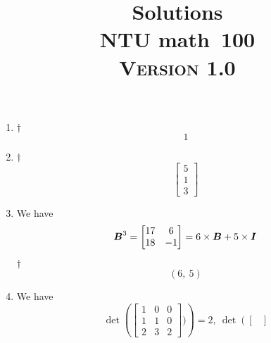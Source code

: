 \documentclass[a4paper,12pt]{article}
\newcommand{\school}{ntu}
\newcommand{\subject}{math}
\renewcommand{\year}{100}
\newcommand{\titlename}{\MakeUppercase{\school} \subject \ \year}
\newcommand{\ver}{\textsc{Version} 1.0} %
\begin{document}
\title{\LARGE{\textbf{Solutions}} \\
	\Huge{\textbf{\titlename}} \\
	\normalsize{\ver}
}
\author{}
\date{}

\maketitle


\begin{enumerate}
	\item \begin{answer}{$\dag$}\begin{equation}
            1
        \end{equation}
    \end{answer}
    \item \begin{answer}{$\dag$}\begin{equation}
            \begin{bmatrix}
                5 \\
                1 \\
                3
            \end{bmatrix}
        \end{equation}
    \end{answer}
    \item We have \begin{equation}
        \boldsymbol{B}^3 = \begin{bmatrix}
            17 & 6 \\
            18 & -1
        \end{bmatrix} = 6 \times \boldsymbol{B} + 5 \times \boldsymbol{I}
    \end{equation}
    \begin{answer}{$\dag$}\begin{equation}
            (6, \ 5)
        \end{equation}
    \end{answer}
    \item We have \begin{equation}
        \det\left(\begin{bmatrix}
            1 & 0 & 0 \\
            1 & 1 & 0 \\
            2 & 3 & 2
        \end{bmatrix})\right) = 2, \ \det\left(\begin{bmatrix}

\end{bmatrix}
\end{equation}
\end{enumerate}
\end{document}
